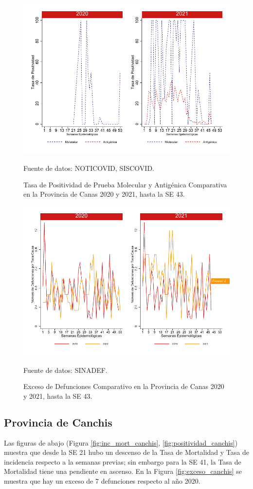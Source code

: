 \documentclass[12pt,a4paper,openany]{book}
\begin{document}
		\begin{figure}[h]
			\caption{Tasa de Positividad de Prueba Molecular y Antigénica Comparativa en la Provincia de Canas 2020 y 2021, hasta la SE 43.}\label{fig:positividad_calca}
			\begin{center}
				\includegraphics[width=0.7\linewidth]{../figuras/positividad_20_21_4}
			\end{center}
			{\footnotesize {Fuente de datos: NOTICOVID, SISCOVID.}}
		\end{figure}
		
		\begin{figure}[h]
			\caption{Exceso de Defunciones Comparativo en la Provincia de Canas 2020 y 2021, hasta la SE 43.}\label{fig:exceso_calca}
			\begin{center}
				\includegraphics[width=0.7\linewidth]{../figuras/exceso_4}
			\end{center}
			{\footnotesize {Fuente de datos: SINADEF.}}
		\end{figure}
		
		\clearpage
		
		\subsection*{Provincia de Canchis}
		\noindent Las figuras de abajo (Figura \ref{fig:inc_mort_canchis}, \ref{fig:positividad_canchis}) muestra que desde la SE 21 hubo un descenso de la Tasa de Mortalidad y Tasa de incidencia respecto a la semanas previas; sin embargo para la SE 41, la Tasa de Mortalidad tiene una pendiente en ascenso. En la Figura \ref{fig:exceso_canchis} se muestra que hay un exceso de 7 defunciones respecto al año 2020.
		
\end{document}

